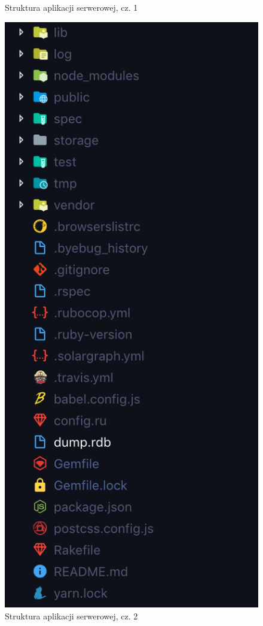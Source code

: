 \documentclass[declaration,shortabstract]{iithesis}
\begin{document}
\begin{figure}
\begin{minipage}[b]{0.4\textwidth}
        \caption{Struktura aplikacji serwerowej, cz. 1}
        \label{fig:struktura_serwer1}
    \end{minipage}
    \hfill
    \begin{minipage}[b]{0.4\textwidth}
        \includegraphics[width=\textwidth]{images/serwer2.png}
        \caption{Struktura aplikacji serwerowej, cz. 2}
        \label{fig:struktura_serwer2}
    \end{minipage}
\end{figure}
\end{document}
